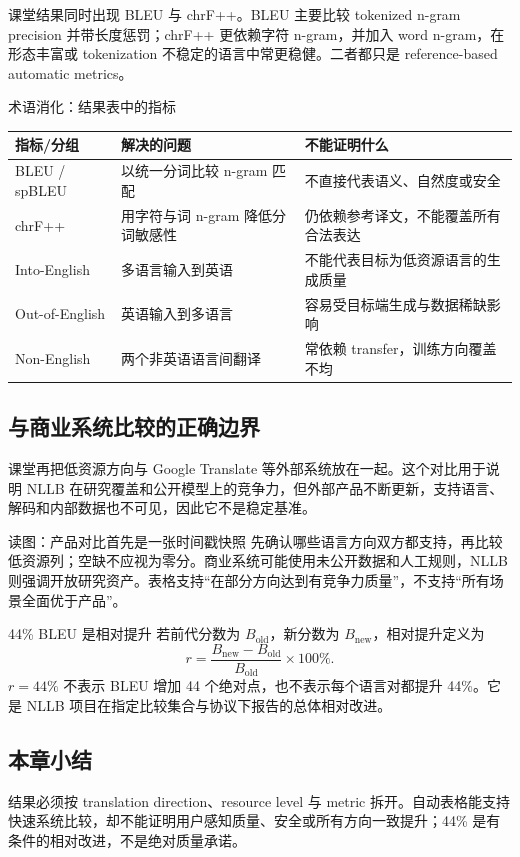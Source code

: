 课堂结果同时出现 BLEU 与 chrF++。BLEU 主要比较 tokenized n-gram precision 并带长度惩罚；chrF++ 更依赖字符 n-gram，并加入 word n-gram，在形态丰富或 tokenization 不稳定的语言中常更稳健。二者都只是 reference-based automatic metrics。

\begin{knowledgebox}{术语消化：结果表中的指标}
\begin{tabularx}{\textwidth}{@{}L{0.2\textwidth}L{0.27\textwidth}X@{}}
\toprule
指标/分组 & 解决的问题 & 不能证明什么 \\
\midrule
BLEU / spBLEU & 以统一分词比较 n-gram 匹配 & 不直接代表语义、自然度或安全 \\
chrF++ & 用字符与词 n-gram 降低分词敏感性 & 仍依赖参考译文，不能覆盖所有合法表达 \\
Into-English & 多语言输入到英语 & 不能代表目标为低资源语言的生成质量 \\
Out-of-English & 英语输入到多语言 & 容易受目标端生成与数据稀缺影响 \\
Non-English & 两个非英语语言间翻译 & 常依赖 transfer，训练方向覆盖不均 \\
\bottomrule
\end{tabularx}
\end{knowledgebox}

\subsection{与商业系统比较的正确边界}

课堂再把低资源方向与 Google Translate 等外部系统放在一起。这个对比用于说明 NLLB 在研究覆盖和公开模型上的竞争力，但外部产品不断更新，支持语言、解码和内部数据也不可见，因此它不是稳定基准。


\begin{knowledgebox}{读图：产品对比首先是一张时间戳快照}
先确认哪些语言方向双方都支持，再比较低资源列；空缺不应视为零分。商业系统可能使用未公开数据和人工规则，NLLB 则强调开放研究资产。表格支持“在部分方向达到有竞争力质量”，不支持“所有场景全面优于产品”。
\end{knowledgebox}

\begin{importantbox}{44\% BLEU 是相对提升}
若前代分数为 $B_{\text{old}}$，新分数为 $B_{\text{new}}$，相对提升定义为
\[
r=\frac{B_{\text{new}}-B_{\text{old}}}{B_{\text{old}}}\times100\%.
\]
$r=44\%$ 不表示 BLEU 增加 44 个绝对点，也不表示每个语言对都提升 44\%。它是 NLLB 项目在指定比较集合与协议下报告的总体相对改进。
\end{importantbox}


\subsection{本章小结}

结果必须按 translation direction、resource level 与 metric 拆开。自动表格能支持快速系统比较，却不能证明用户感知质量、安全或所有方向一致提升；44\% 是有条件的相对改进，不是绝对质量承诺。

